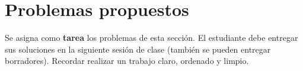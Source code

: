 \section{Problemas propuestos}

Se asigna como \textbf{tarea} los problemas de esta sección.
El estudiante debe entregar sus soluciones en la siguiente sesión de clase (también se pueden entregar borradores).
Recordar realizar un trabajo claro, ordenado y limpio.